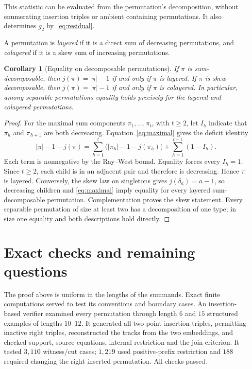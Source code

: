 \documentclass[11pt,a4paper]{article}
\newtheorem{corollary}[theorem]{Corollary}
\theoremstyle{remark}
\begin{document}
This statistic can be evaluated from the permutation's decomposition,
without enumerating insertion triples or ambient containing permutations.
It also determines $g_2$ by~\eqref{eq:residual}.

A permutation is \emph{layered} if it is a direct sum of decreasing
permutations, and \emph{colayered} if it is a skew sum of increasing
permutations.

\begin{corollary}[Equality on decomposable permutations]\label{cor:equality}
If $\pi$ is sum-decomposable, then
$j(\pi)=|\pi|-1$ if and only if $\pi$ is layered.
If $\pi$ is skew-decomposable, then
$j(\pi)=|\pi|-1$ if and only if $\pi$ is colayered.
In particular, among separable permutations equality holds precisely
for the layered and colayered permutations.
\end{corollary}
\begin{proof}
For the maximal sum components $\pi_1,\ldots,\pi_t$, with $t\ge2$,
let $I_h$ indicate that $\pi_h$ and $\pi_{h+1}$ are both decreasing.
Equation~\eqref{eq:maximal} gives the deficit identity
\begin{equation}\label{eq:deficit}
 |\pi|-1-j(\pi)=
 \sum_{h=1}^{t}\bigl(|\pi_h|-1-j(\pi_h)\bigr)
 +\sum_{h=1}^{t-1}(1-I_h).
\end{equation}
Each term is nonnegative by the Ray--West bound. Equality forces every
$I_h=1$. Since $t\ge2$, each child is in an adjacent pair and therefore
is decreasing. Hence $\pi$ is layered. Conversely, the skew law on
singletons gives $j(\delta_a)=a-1$, so decreasing children and
\eqref{eq:maximal} imply equality for every layered sum-decomposable
permutation. Complementation proves the skew statement. Every separable
permutation of size at least two has a decomposition of one type; in
size one equality and both descriptions hold directly.
\end{proof}

\section{Exact checks and remaining questions}

The proof above is uniform in the lengths of the summands. Exact finite
computations served to test its conventions and boundary cases.
An insertion-based verifier examined every permutation through length
$6$ and $15$ structured examples of lengths $10$--$12$. It generated
all two-point insertion triples, permitting inactive right triples,
reconstructed the tracks from the two embeddings, and checked support,
source equations, internal restriction and the join criterion.
It tested $3{,}110$ witness/cut cases; $1{,}219$ used positive-prefix
restriction and $188$ required changing the right inserted permutation.
All checks passed.
\end{document}
